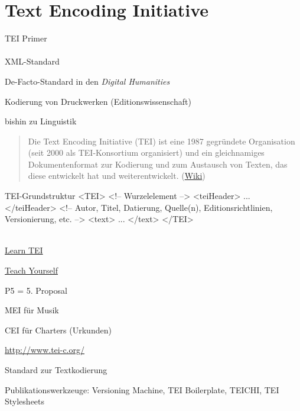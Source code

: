 \section{Text Encoding Initiative}
\begin{frame}{TEI Primer}
\footnotesize
{}\\
\\
XML-Standard \item De-Facto-Standard in den \emph{Digital Humanities} \item Kodierung von Druckwerken (Editionswissenschaft) \item bishin zu Linguistik
\begin{quote}
    Die Text Encoding Initiative (TEI) ist eine 1987 gegründete Organisation (seit 2000 als TEI-Konsortium organisiert) und ein gleichnamiges Dokumentenformat zur Kodierung und zum Austausch von Texten, das diese entwickelt hat und weiterentwickelt.  (\href{https://de.wikipedia.org/wiki/Text_Encoding_Initiative}{Wiki})
\end{quote}

\begin{myxml}{TEI-Grundstruktur}
<TEI> <!-- Wurzelelement -->
    <teiHeader> ... </teiHeader> <!-- Autor, Titel, Datierung, Quelle(n), Editionsrichtlinien,
Versionierung, etc. -->
    <text> ... </text>
</TEI>
\end{myxml}
\smallskip

\\
\href{http://www.tei-c.org/Support/Learn/}{Learn TEI} \item \href{http://www.tei-c.org/support/learn/teach-yourself-tei/}{Teach Yourself} \item P5 = 5. Proposal \item MEI für Musik \item CEI für Charters (Urkunden) \item \href{http://www.tei-c.org/}{http://www.tei-c.org/} \item Standard zur Textkodierung \item Publikationswerkzeuge: Versioning Machine, TEI Boilerplate, TEICHI, TEI
Stylesheets 
\end{frame}

